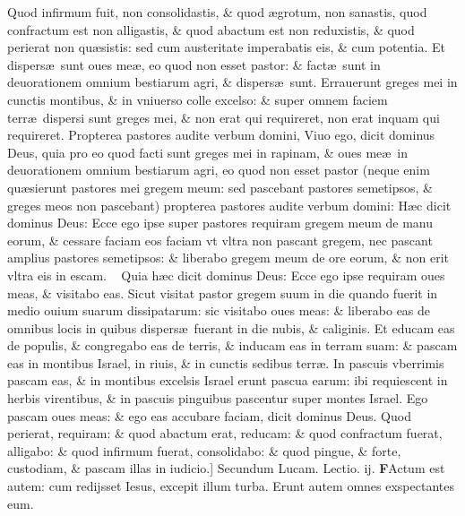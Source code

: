 \documentclass[a5paper,10pt]{book}
\def\leftmarginnote{%
	\lrmarginnote{\hskip -\marginparsep \hskip -6.5em}}
\def\rightmarginnote{%
	\lrmarginnote{\hskip\columnwidth \hskip -1em}}
\def\ae{æ}
\begin{document}
\begin{multicols*}{2}
Quod infirmum fuit, non consolidastis, \& quod \ae grotum, non sanastis, quod confractum est non alligastis, \& quod abactum est non reduxistis, \& quod perierat non qu\ae sistis: sed cum austeritate imperabatis eis, \& cum potentia.
Et dispers\ae \ sunt oues me\ae , eo quod non esset pastor: \& fact\ae \ sunt in deuorationem omnium bestiarum agri, \& dispers\ae \ sunt.
Errauerunt greges mei in cunctis montibus, \& in vniuerso colle excelso: \& super omnem faciem terr\ae \ dispersi sunt greges mei, \& non erat qui requireret, non erat inquam qui requireret.
Propterea pastores audite verbum domini, Viuo ego, dicit dominus Deus, quia pro eo quod facti sunt greges mei in rapinam, \& oues me\ae \ in deuorationem omnium bestiarum agri, eo quod non esset pastor (neque enim qu\ae sierunt pastores mei gregem meum: sed pascebant pastores semetipsos, \& greges meos non pascebant) propterea pastores audite verbum domini: H\ae c dicit dominus Deus: Ecce ego ipse super pastores requiram gregem meum de manu eorum, \& cessare faciam eos faciam vt vltra non pascant gregem, nec pascant amplius pastores semetipsos: \& liberabo gregem meum de ore eorum, \& non erit vltra eis in escam. \textdagger \ \rightmarginnote{B}
Quia h\ae c dicit dominus Deus: Ecce ego ipse requiram oues meas, \& visitabo eas.
Sicut visitat pastor gregem suum in die quando fuerit in medio ouium suarum dissipatarum: sic visitabo oues meas: \& liberabo eas de omnibus locis in quibus dispers\ae \ fuerant in die nubis, \& caliginis.
Et educam eas de populis, \& congregabo eas de terris, \& inducam eas in terram suam: \& pascam eas in montibus Israel, in riuis, \& in cunctis sedibus terr\ae .
In pascuis vberrimis pascam eas, \& in montibus excelsis Israel erunt pascua earum: ibi requiescent in herbis virentibus, \& in pascuis pinguibus pascentur super montes Israel.
Ego pascam oues meas: \& ego eas accubare faciam, dicit dominus Deus.
Quod perierat, requiram: \& quod abactum erat, reducam: \& quod confractum fuerat, alligabo: \& quod infirmum fuerat, consolidabo: \& quod pingue, \& forte, custodiam, \& pascam illas in iudicio.]
\fancyhead[C]{\color{red} Sabbato Dominic\ae . iij. aduentus}
\newline \color{red} Secundum Lucam. \hfill Lectio. ij. \color{black}
\vspace{-.25em}
\lettrine[lines=2]{\bfseries \color{red} F}{}Actum\leftmarginnote{\begin{flushright}ca. 8.\end{flushright}} est autem: cum redijsset Iesus, excepit illum turba.
Erunt autem omnes exspectantes eum.

\end{multicols*}
\end{document}

